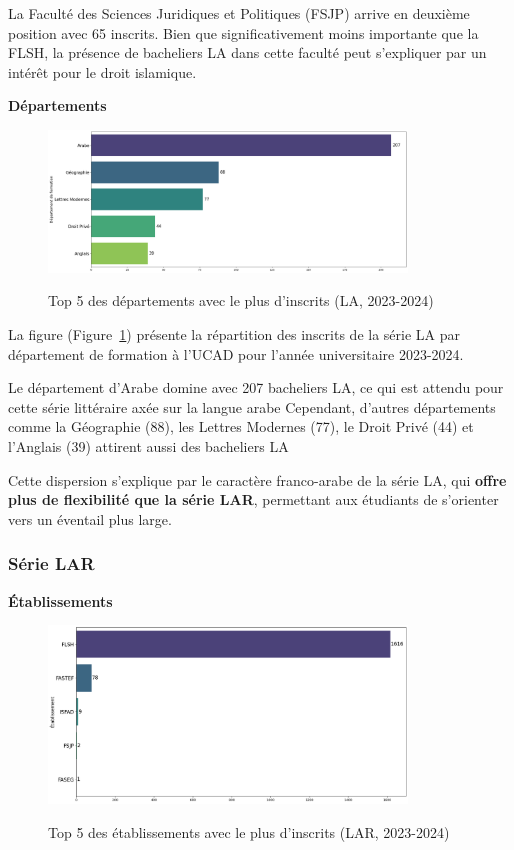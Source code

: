 La Faculté des Sciences Juridiques et Politiques (FSJP) arrive en deuxième position avec 65 inscrits. Bien que significativement moins importante que la FLSH, la présence de bacheliers LA dans cette faculté peut s'expliquer par un intérêt pour le droit islamique.

\textbf{Départements}

\begin{figure}[ht]
\centering
\caption{Top 5 des départements avec le plus d'inscrits (LA, 2023-2024)}
\includegraphics[width=0.85\textwidth]{figure/dep_LA_2024.png}
\label{fig:dep_la_2024}
\end{figure}

La figure (Figure~\ref{fig:dep_la_2024}) présente la répartition des inscrits de la série LA par département de formation à l'UCAD pour l'année universitaire 2023-2024.

Le département d'Arabe domine avec 207 bacheliers LA, ce qui est attendu pour cette série littéraire axée sur la langue arabe
Cependant, d’autres départements comme la Géographie (88), les Lettres Modernes (77), le Droit Privé (44) et l’Anglais (39) attirent aussi des bacheliers LA

Cette dispersion s’explique par le caractère franco-arabe de la série LA, qui \textbf{offre plus de flexibilité que la série LAR}, permettant aux étudiants de s’orienter vers un éventail plus large.

\subsubsection{Série LAR}

\textbf{Établissements}

\begin{figure}[ht]
\centering
\caption{Top 5 des établissements avec le plus d'inscrits (LAR, 2023-2024)}
\includegraphics[width=0.85\textwidth]{figure/etab_LAR_2024.png}
\label{fig:etab_lar_2024}
\end{figure}


